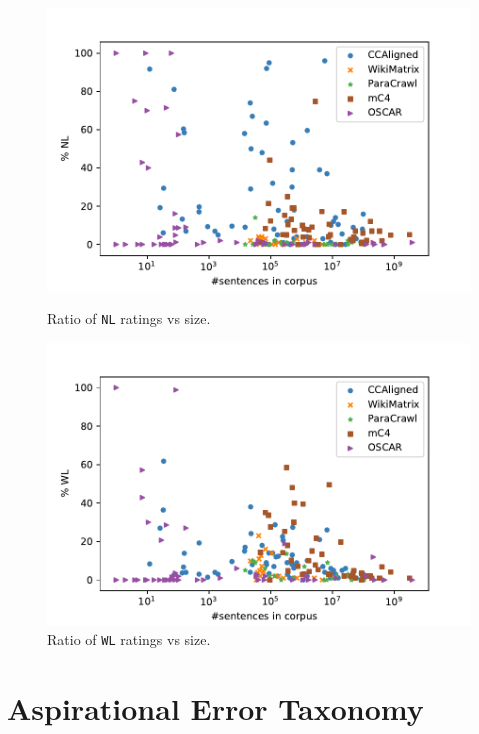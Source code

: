 \begin{figure}[ht]
\begin{minipage}[b]{0.5\linewidth}
        \includegraphics[width=\linewidth]{static/media/data/quality/NL.pdf}
        \caption{Ratio of \texttt{NL} ratings vs size.}
        \label{fig:nl}
        \vspace{4ex}
    \end{minipage}%
    \begin{minipage}[b]{0.5\linewidth}
        \centering
        \includegraphics[width=\linewidth]{static/media/data/quality/WL.pdf}
        \caption{Ratio of \texttt{WL} ratings vs size.}
        \label{fig:wl}
        \vspace{4ex}
    \end{minipage}
\end{figure}


\section{Aspirational Error Taxonomy}
\label{app:improved}

